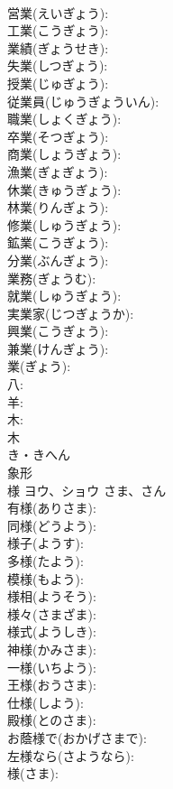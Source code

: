 \documentclass[8pt]{extreport}
\begin{document}
\begin{CJK}{UTF8}{min}
\\	営業(えいぎょう): 
\\	工業(こうぎょう): 
\\	業績(ぎょうせき): 
\\	失業(しつぎょう): 
\\	授業(じゅぎょう): 
\\	従業員(じゅうぎょういん): 
\\	職業(しょくぎょう): 
\\	卒業(そつぎょう): 
\\	商業(しょうぎょう): 
\\	漁業(ぎょぎょう): 
\\	休業(きゅうぎょう): 
\\	林業(りんぎょう): 
\\	修業(しゅうぎょう): 
\\	鉱業(こうぎょう): 
\\	分業(ぶんぎょう): 
\\	業務(ぎょうむ): 
\\	就業(しゅうぎょう): 
\\	実業家(じつぎょうか): 
\\	興業(こうぎょう): 
\\	兼業(けんぎょう): 
\\	業(ぎょう): 
\\	八: 
\\	羊: 
\\	木: 
\\	木	
\\	き・きへん	
\\	象形 
\\	様	ヨウ、ショウ	さま、さん		
\\	有様(ありさま): 
\\	同様(どうよう): 
\\	様子(ようす): 
\\	多様(たよう): 
\\	模様(もよう): 
\\	様相(ようそう): 
\\	様々(さまざま): 
\\	様式(ようしき): 
\\	神様(かみさま): 
\\	一様(いちよう): 
\\	王様(おうさま): 
\\	仕様(しよう): 
\\	殿様(とのさま): 
\\	お蔭様で(おかげさまで): 
\\	左様なら(さようなら): 
\\	様(さま): 

\end{CJK}
\end{document}
